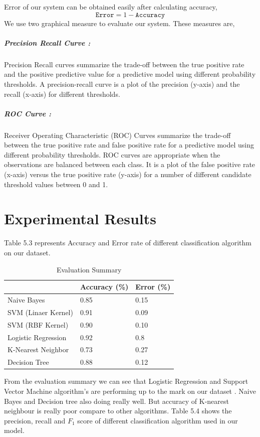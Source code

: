\documentclass[12pt,a4paper]{report}
\begin{document}
Error of our system can be obtained easily after calculating accuracy,
\begin{equation}
    \texttt{Error} = 1-\texttt{Accuracy}
\end{equation}
We use two graphical measure to evaluate our system. These measures are,
\subparagraph{Precision Recall Curve :}
Precision Recall curves summarize the trade-off between the true positive rate and the positive predictive value for a predictive model using different probability thresholds. A precision-recall curve is a plot of the precision (y-axis) and the recall (x-axis) for different thresholds.

\subparagraph{ROC Curve :}
Receiver Operating Characteristic (ROC) Curves summarize the trade-off between the true positive rate and false positive rate for a predictive model using different probability thresholds. ROC curves are appropriate when the observations are balanced between each class. It is a plot of the false positive rate (x-axis) versus the true positive rate (y-axis) for a number of different candidate threshold values between 0 and 1.

\section{Experimental Results}
Table 5.3 represents Accuracy and Error rate of different classification algorithm on our dataset.
\renewcommand{\arraystretch}{1.5}
\begin{table}[h!]
\begin{center}
\caption{Evaluation Summary}
\begin{tabular}{|m{7cm} | m{3cm}| m{3cm}|}
\hline
     & Accuracy (\%) & Error (\%) \\
\hline
    Naive Bayes & 0.85 & 0.15\\
\hline 
    SVM (Linaer Kernel) & 0.91 & 0.09\\
\hline 
    SVM (RBF Kernel) & 0.90 & 0.10\\
\hline 
    Logistic Regression & 0.92 & 0.8\\
\hline
    K-Nearest Neighbor & 0.73 & 0.27\\
\hline
    Decision Tree & 0.88 & 0.12\\
\hline
\end{tabular}
\end{center}
\end{table}
\par
\noindent
From the evaluation summary we can see that Logistic Regression and Support Vector Machine algorithm's are performing up to the mark on our dataset . Naive Bayes and Decision tree also doing really well. But accuracy of K-nearest neighbour is really poor compare to other algorithms. 
\clearpage
\noindent
Table 5.4 shows the precision, recall and $F_1$ score of different classification algorithm used in our model.
\end{document}
